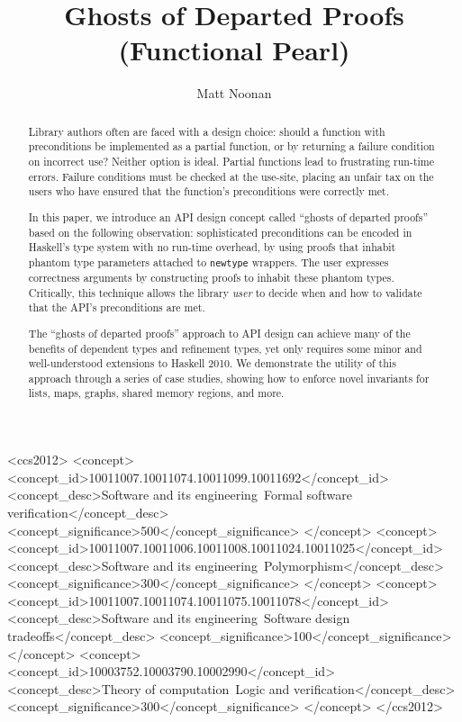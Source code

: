 \documentclass[format=sigplan, review=false, screen=true, 10pt]{acmart}
\begin{document}
\title[Ghosts of Departed Proofs]{Ghosts of Departed Proofs (Functional Pearl)}

\author{Matt Noonan}


\begin{abstract}

  Library authors often are faced with a design choice: should a function with
  preconditions be implemented as a partial function, or by returning a failure
  condition on incorrect use? Neither option is ideal. Partial functions lead
  to frustrating run-time errors. Failure conditions must be checked
  at the use-site,
  placing an unfair tax on the users who have ensured that the function's
  preconditions were correctly met.
  
  In this paper, we introduce an API design concept called ``ghosts of departed
  proofs'' based on the following observation: sophisticated preconditions can be
  encoded in Haskell's type system with no run-time overhead, by using proofs
  that inhabit phantom type parameters attached to \texttt{newtype} wrappers.
  The user expresses correctness arguments by constructing proofs to inhabit
  these phantom types.
  Critically, this technique allows the
  library \emph{user} to decide when and how to validate that the API's preconditions
  are met.

  The ``ghosts of departed proofs'' approach to API design can achieve many of the benefits
  of dependent types and refinement types, yet only requires some minor and well-understood
  extensions to Haskell 2010. We demonstrate the utility of this approach
  through a series of case studies, showing how to enforce novel invariants for lists,
  maps, graphs, shared memory regions, and more.
\end{abstract}


%
%
 \begin{CCSXML}
<ccs2012>
<concept>
<concept_id>10011007.10011074.10011099.10011692</concept_id>
<concept_desc>Software and its engineering~Formal software verification</concept_desc>
<concept_significance>500</concept_significance>
</concept>
<concept>
<concept_id>10011007.10011006.10011008.10011024.10011025</concept_id>
<concept_desc>Software and its engineering~Polymorphism</concept_desc>
<concept_significance>300</concept_significance>
</concept>
<concept>
<concept_id>10011007.10011074.10011075.10011078</concept_id>
<concept_desc>Software and its engineering~Software design tradeoffs</concept_desc>
<concept_significance>100</concept_significance>
</concept>
<concept>
<concept_id>10003752.10003790.10002990</concept_id>
<concept_desc>Theory of computation~Logic and verification</concept_desc>
<concept_significance>300</concept_significance>
</concept>
</ccs2012>
\end{CCSXML}
\end{document}
